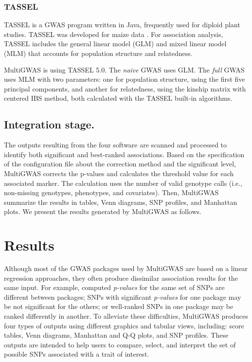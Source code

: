 \documentclass{article}
\begin{document}
\subsubsection{TASSEL}

TASSEL  \cite{Bradbury2007}  is a GWAS program written in Java, frequently used for diploid plant studies. TASSEL was developed for maize data \cite{Alvarez2017,Zhang2018}. For association analysis, TASSEL includes the general linear model (GLM) and mixed linear model (MLM) that accounts for population structure and relatedness.

MultiGWAS is using TASSEL 5.0. The \emph{naive} GWAS uses GLM. The \emph{full} GWAS uses MLM with two parameters: one for population structure, using the first five principal components, and another for relatedness, using the kinship matrix with centered IBS method, both calculated with the TASSEL built-in algorithms.


\subsection{Integration stage.} The outputs resulting from the four software are scanned and processed to identify both significant and best-ranked associations. Based on the specification of the configuration file about the correction method and the significant level, MultiGWAS corrects the p-values and calculates the threshold value for each associated marker. The calculation uses the number of valid genotype calls (i.e., non-missing genotypes, phenotypes, and covariates).  Then, MultiGWAS summarize the results in tables, Venn diagrams, SNP profiles, and  Manhattan plots. We present the  results generated by MultiGWAS as follows.

\section{Results}

Although most of the GWAS packages used by MultiGWAS are based on a linear regression approaches, they often produce dissimilar association results for the same input. For example, computed \emph{p-values }for the same set of SNPs are different between packages; SNPs with significant \emph{p-values} for one package may be not significant for the others; or well-ranked SNPs in one package may be ranked differently in another. To alleviate these difficulties, MultiGWAS produces four types of outputs using different graphics and tabular views, including: score tables, Venn diagrams, Manhattan and Q-Q plots, and SNP profiles. These outputs are intended to help users to compare, select, and interpret the set of possible SNPs associated with a trait of interest. 
\end{document}
